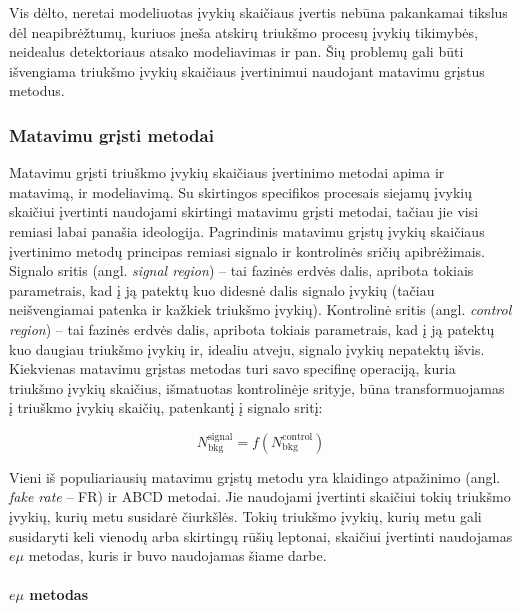 \documentclass[a4paper, 12pt]{article}
\newcommand{\emu}{e\mu}
\newlength\q
\begin{document}
Vis dėlto, neretai modeliuotas įvykių skaičiaus įvertis nebūna pakankamai tikslus dėl
neapibrėžtumų, kuriuos įneša atskirų triukšmo procesų įvykių tikimybės, neidealus detektoriaus
atsako modeliavimas ir pan.
Šių problemų gali būti išvengiama triukšmo įvykių skaičiaus įvertinimui naudojant matavimu
grįstus metodus.

\subsubsection*{Matavimu grįsti metodai}

Matavimu grįsti triuškmo įvykių skaičiaus įvertinimo metodai apima ir matavimą, ir modeliavimą.
Su skirtingos specifikos procesais siejamų įvykių skaičiui įvertinti naudojami skirtingi
matavimu grįsti metodai, tačiau jie visi remiasi labai panašia ideologija.
Pagrindinis matavimu grįstų įvykių skaičiaus įvertinimo metodų principas remiasi signalo ir
kontrolinės sričių apibrėžimais.
Signalo sritis (angl. \textit{signal region}) -- tai fazinės erdvės dalis, apribota tokiais
parametrais, kad į ją patektų kuo didesnė dalis signalo įvykių (tačiau neišvengiamai patenka
ir kažkiek triukšmo įvykių).
Kontrolinė sritis (angl. \textit{control region}) -- tai fazinės erdvės dalis, apribota
tokiais parametrais, kad į ją patektų kuo daugiau triukšmo įvykių ir, idealiu atveju, signalo
įvykių nepatektų išvis.
Kiekvienas matavimu grįstas metodas turi savo specifinę operaciją, kuria triukšmo įvykių skaičius,
išmatuotas kontrolinėje srityje, būna transformuojamas į triuškmo įvykių skaičių, patenkantį į
signalo sritį:

\begin{equation}
	N_{\mathrm{bkg}}^{\mathrm{signal}} = f( N_{\mathrm{bkg}}^{\mathrm{control}} )
\end{equation}

Vieni iš populiariausių matavimu grįstų metodu yra klaidingo atpažinimo (angl.
\textit{fake rate} -- FR) ir ABCD metodai.
Jie naudojami įvertinti skaičiui tokių triukšmo įvykių, kurių metu susidarė čiurkšlės.
Tokių triukšmo įvykių, kurių metu gali susidaryti keli vienodų arba skirtingų
rūšių leptonai, skaičiui įvertinti naudojamas $\emu$ metodas, kuris ir buvo naudojamas šiame
darbe.

\paragraph{$e\mu$ metodas\\}
\end{document}
